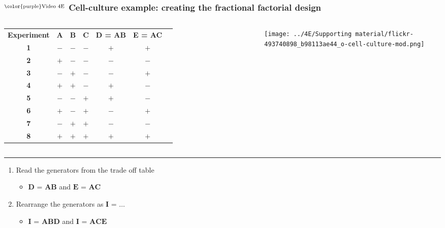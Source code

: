 \begin{frame}\frametitle{$^\text{\color{purple}Video 4E}$ Cell-culture example: creating the fractional factorial design}
	
	\vspace{0.5cm}
	\begin{columns}[T]
			{\scriptsize
				\begin{tabulary}{\linewidth}{ccccccc}
					\textbf{\relax Experiment} & \textbf{\relax A } & \textbf{\relax B} & \textbf{\relax C } & \textbf{\relax D = AB} & \textbf{\relax E = AC}\\ 
					\textbf{1} & \(-\) & \(-\) & \(-\) & \(+\) & \(+\) \\
					\textbf{2} & \(+\) & \(-\) & \(-\) & \(-\) & \(-\) \\
					\textbf{3} & \(-\) & \(+\) & \(-\) & \(-\) & \(+\) \\
					\textbf{4} & \(+\) & \(+\) & \(-\) & \(+\) & \(-\) \\
					\textbf{5} & \(-\) & \(-\) & \(+\) & \(+\) & \(-\) \\
					\textbf{6} & \(+\) & \(-\) & \(+\) & \(-\) & \(+\) \\
					\textbf{7} & \(-\) & \(+\) & \(+\) & \(-\) & \(-\) \\
					\textbf{8} & \(+\) & \(+\) & \(+\) & \(+\) & \(+\) \\
				\end{tabulary}
			}
		
			\vspace{-0.2cm}
			\centerline{\texttt{[image: ../4E/Supporting material/flickr-493740898\_b98113ae44\_o-cell-culture-mod.png]} }
			
	\end{columns}
	
	\vspace{0.2cm}
	\hrule
	\begin{enumerate}
		\item	Read the generators from the trade off table 
			\begin{itemize}
				\item		$\textbf{D = AB}$  and $\textbf{E = AC}$ 
			\end{itemize}
		
		\item	Rearrange the generators as  $\textbf{I = \ldots}$
			\begin{itemize}
				\item	$\textbf{I = ABD}$ and $\textbf{I = ACE}$ 
			\end{itemize}
			

\end{enumerate}
\end{frame}
